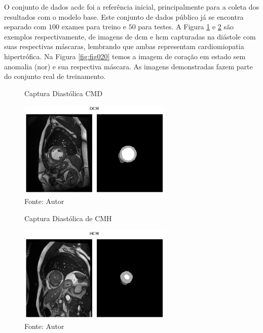 O conjunto de dados \gls{acdc} foi a referência inicial, principalmente para a coleta dos resultados com o modelo base. Este conjunto de dados público já se encontra separado com $100$ exames para treino e $50$ para testes. A Figura \ref{fig:fig018} e \ref{fig:fig019} são exemplos respectivamente, de imagens de \gls{dcm} e \gls{hcm} capturadas na diástole com suas respectivas máscaras, lembrando que ambas representam cardiomiopatia hipertrófica. Na Figura \ref{fig:fig020} temos a imagem de coração em estado sem anomalia (\gls{nor}) e sua respectiva máscara. As imagens demonstradas fazem parte do conjunto real de treinamento.

\begin{figure}[h!]
    \centering
    \captionsetup{width=0.98\textwidth, justification=justified}
    \caption{Captura Diastólica CMD}
    \includegraphics[width=0.65\textwidth]{figures/fig018.png}
    \caption*{Fonte: Autor}
    \label{fig:fig018}
\end{figure}

\begin{figure}[h!]
    \centering
    \captionsetup{width=0.98\textwidth, justification=justified}
    \caption{Captura Diastólica de CMH}
    \includegraphics[width=0.65\textwidth]{figures/fig019.png}
    \caption*{Fonte: Autor}
    \label{fig:fig019}
\end{figure}

